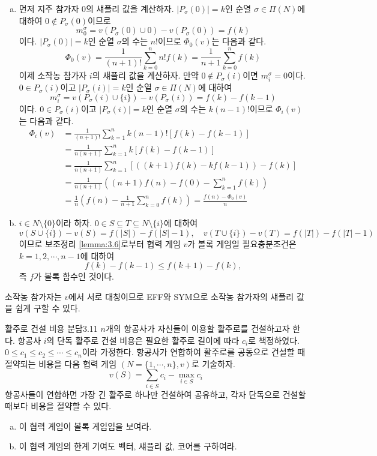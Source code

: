 \documentclass{article}
\numberwithin{equation}{section}
\begin{document}
\begin{sol}
	\begin{enumerate}[(a)]
		\item 먼저 지주 참가자 $0$의 섀플리 값을 계산하자. $\vert P_\sigma(0)\vert=k$인 순열 $\sigma\in\Pi(N)$에 대하여 $0\notin P_\sigma(0)$이므로
			\[
				m_0^\sigma=v(P_\sigma(0)\cup0)-v(P_\sigma(0))=f(k)
			\]
			이다. $\vert P_\sigma(0)\vert=k$인 순열 $\sigma$의 수는 $n!$이므로 $\Phi_0(v)$는 다음과 같다.
			\[
				\Phi_0(v)=\frac{1}{(n+1)!}\sum_{k=0}^nn!f(k)=\frac{1}{n+1}\sum_{k=0}^nf(k)
			\]
			이제 소작농 참가자 $i$의 섀플리 값을 계산하자. 만약 $0\notin P_\sigma(i)$이면 $m_i^\sigma=0$이다. $0\in P_\sigma(i)$이고 $\vert P_\sigma(i)\vert=k$인 순열 $\sigma\in\Pi(N)$에 대하여
			\[
				m_i^\sigma=v(P_\sigma(i)\cup\{i\})-v(P_\sigma(i))=f(k)-f(k-1)
			\]
			이다. $0\in P_\sigma(i)$이고 $\vert P_\sigma(i)\vert=k$인 순열 $\sigma$의 수는 $k(n-1)!$이므로 $\Phi_i(v)$는 다음과 같다.
			\[
				\begin{aligned}
					\Phi_i(v)&=\frac{1}{(n+1)!}\sum_{k=1}^nk(n-1)![f(k)-f(k-1)]\\
					&=\frac{1}{n(n+1)}\sum_{k=1}^nk[f(k)-f(k-1)]\\
					&=\frac{1}{n(n+1)}\sum_{k=1}^n[((k+1)f(k)-kf(k-1))-f(k)]\\
					&=\frac{1}{n(n+1)}\left((n+1)f(n)-f(0)-\sum_{k=1}^nf(k)\right)\\
					&=\frac{1}{n}\left(f(n)-\frac{1}{n+1}\sum_{k=0}^nf(k)\right)=\frac{f(n)-\Phi_0(v)}{n}
				\end{aligned}
			\]
		\item $i\in N\setminus\{0\}$이라 하자. $0\in S\subseteq T\subseteq N\setminus\{i\}$에 대하여
			\[
				v(S\cup\{i\})-v(S)=f(\vert S\vert)-f(\vert S\vert-1),\quad v(T\cup\{i\})-v(T)=f(\vert T\vert)-f(\vert T\vert-1)
			\]
			이므로 보조정리 \ref{lemma:3.6}로부터 협력 게임 $v$가 볼록 게임일 필요충분조건은 $k=1,2,\cdots,n-1$에 대하여
			\[
				f(k)-f(k-1)\leq f(k+1)-f(k),
			\]
			즉 $f$가 볼록 함수인 것이다.
	\end{enumerate}
\end{sol}

\begin{remark}
	소작농 참가자는 $v$에서 서로 대칭이므로 EFF와 SYM으로 소작농 참가자의 섀플리 값을 쉽게 구할 수 있다.
\end{remark}

\begin{prob}{활주로 건설 비용 분담}{3.11}
	$n$개의 항공사가 자신들이 이용할 활주로를 건설하고자 한다. 항공사 $i$의 단독 활주로 건설 비용은 필요한 활주로 길이에 따라 $c_i$로 책정하였다. $0\leq c_1\leq c_2\leq\cdots\leq c_n$이라 가정한다. 항공사가 연합하여 활주로를 공동으로 건설할 때 절약되는 비용을 다음 협력 게임 $(N=\{1,\cdots,n\},v)$로 기술하자.
	\[
		v(S)=\sum_{i\in S}c_i-\max_{i\in S}c_i
	\]
	항공사들이 연합하면 가장 긴 활주로 하나만 건설하여 공유하고, 각자 단독으로 건설할 때보다 비용을 절약할 수 있다.
	\begin{enumerate}[(a)]
		\item 이 협력 게임이 볼록 게임임을 보여라.
		\item 이 협력 게임의 한계 기여도 벡터, 섀플리 값, 코어를 구하여라.
	\end{enumerate}
\end{prob}
\end{document}
